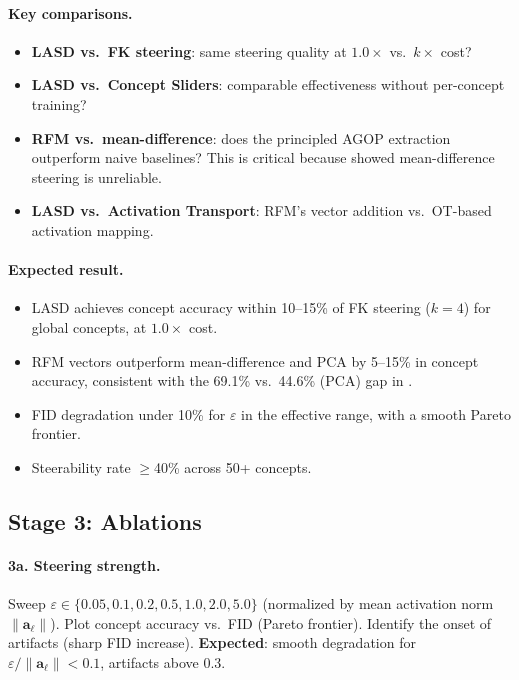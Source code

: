 \documentclass[11pt]{article}
\newcommand{\ba}{\mathbf{a}}
\begin{document}
\paragraph{Key comparisons.}
\begin{itemize}[leftmargin=*]
    \item \textbf{LASD vs.\ FK steering}: same steering quality at $1.0\times$ vs.\ $k\times$ cost?
    \item \textbf{LASD vs.\ Concept Sliders}: comparable effectiveness without per-concept training?
    \item \textbf{RFM vs.\ mean-difference}: does the principled AGOP extraction outperform naive baselines?
    This is critical because \citet{lyu2025activation} showed mean-difference steering is unreliable.
    \item \textbf{LASD vs.\ Activation Transport}: RFM's vector addition vs.\ OT-based activation mapping.
\end{itemize}

\paragraph{Expected result.}
\begin{itemize}[leftmargin=*]
    \item LASD achieves concept accuracy within 10--15\% of FK steering ($k = 4$) for global concepts, at $1.0\times$ cost.
    \item RFM vectors outperform mean-difference and PCA by 5--15\% in concept accuracy, consistent with the 69.1\% vs.\ 44.6\% (PCA) gap in \citet{beaglehole2026universal}.
    \item FID degradation under 10\% for $\varepsilon$ in the effective range, with a smooth Pareto frontier.
    \item Steerability rate $\geq$40\% across 50+ concepts.
\end{itemize}

\subsection{Stage 3: Ablations}
\label{sec:exp_stage3}

\paragraph{3a. Steering strength.}
Sweep $\varepsilon \in \{0.05, 0.1, 0.2, 0.5, 1.0, 2.0, 5.0\}$ (normalized by mean activation norm $\|\ba_\ell\|$).
Plot concept accuracy vs.\ FID (Pareto frontier).
Identify the onset of artifacts (sharp FID increase).
\textbf{Expected}: smooth degradation for $\varepsilon / \|\ba_\ell\| < 0.1$, artifacts above 0.3.
\end{document}
